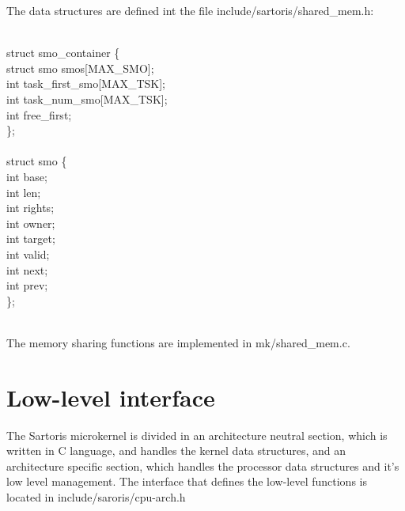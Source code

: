 \documentclass[11pt, letterpaper, twoside, english]{book}
\begin{document}
The data structures are defined int the file \textsf{include/sartoris/shared\_mem.h}: \\
\\
\begin{sf} \noindent struct smo\_container \{ \\
\indent  struct smo smos[MAX\_SMO]; \\ 
\indent  int task\_first\_smo[MAX\_TSK]; \\ 
\indent  int task\_num\_smo[MAX\_TSK]; \\
\indent  int free\_first; \\
\}; \\
\\
struct smo \{ \\
\indent  int base; \\
\indent   int len; \\
\indent   int rights; \\
\indent   int owner; \\
\indent   int target; \\
\indent   int valid; \\
\indent   int next; \\
\indent   int prev; \\
\}; \\
\end{sf}
\\
The memory sharing functions are implemented in \textsf{mk/shared\_mem.c}.

\section{Low-level interface} \label{sec:lowlevelinterface}
The Sartoris microkernel is divided in an architecture neutral section, which is written in C language, and handles the kernel data structures, and an architecture specific section, which handles the processor data structures and it's low level management. The interface that defines the low-level functions is located in \textsf{include/saroris/cpu-arch.h}
\end{document}
